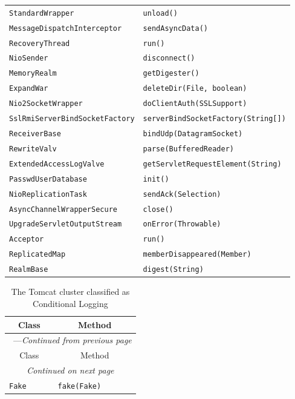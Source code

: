 \begin{center}
\begin{longtable}{ll}
\lstinline/StandardWrapper/&{\lstinline/unload()/}\\
\lstinline/MessageDispatchInterceptor/&{\lstinline/sendAsyncData()/}\\
\lstinline/RecoveryThread/&{\lstinline/run()/}\\
\lstinline/NioSender/&{\lstinline/disconnect()/}\\
\lstinline/MemoryRealm/&{\lstinline/getDigester()/}\\
\lstinline/ExpandWar/&{\lstinline/deleteDir(File, boolean)/}\\
\lstinline/Nio2SocketWrapper/&{\lstinline/doClientAuth(SSLSupport)/}\\
\lstinline/SslRmiServerBindSocketFactory/&{\lstinline/serverBindSocketFactory(String[])/}\\
\lstinline/ReceiverBase/&{\lstinline/bindUdp(DatagramSocket)/}\\
\lstinline/RewriteValv/&{\lstinline/parse(BufferedReader)/}\\
\lstinline/ExtendedAccessLogValve/&{\lstinline/getServletRequestElement(String)/}\\
\lstinline/PasswdUserDatabase/&{\hspace*{-2.5pt}\lstinline/init()/}\\
\lstinline/NioReplicationTask/&{\lstinline/sendAck(Selection)/}\\
\lstinline/AsyncChannelWrapperSecure/&{\lstinline/close()/}\\
\lstinline/UpgradeServletOutputStream/&{\lstinline/onError(Throwable)/}\\
\lstinline/Acceptor/&{\lstinline/run()/}\\
\lstinline/ReplicatedMap/&{\lstinline/memberDisappeared(Member)/}\\
\lstinline/RealmBase/&{\lstinline/digest(String)/}\\
\end{longtable}
\end{center}

\begin{center}
\begin{longtable}{ll}
\caption{The Tomcat cluster classified as Conditional Logging}\\
\toprule\multicolumn{1}{c}{Class}&\multicolumn{1}{c}{Method}\\\midrule
\endfirsthead

\multicolumn{2}{c}{\tablename\ \thetable{}---\textit{Continued from previous page}} \\\midrule
\multicolumn{1}{c}{Class}&\multicolumn{1}{c}{Method}\\\midrule
\endhead
\multicolumn{2}{c}{\textit{Continued on next page}}\\\midrule
\endfoot
\bottomrule
\endlastfoot
\lstinline/Fake/&{\lstinline/fake(Fake)/}\\
\end{longtable}
\end{center}

